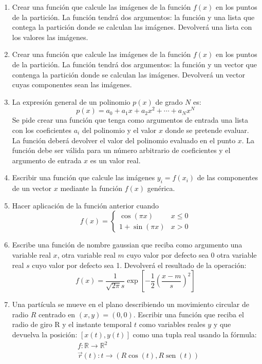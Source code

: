 \documentclass[12pt]{article}
\begin{document}
\begin{enumerate}
\item Crear una función que calcule las imágenes de la función $ f(x) $ 
	en los puntos de la partición. La función tendrá dos argumentos: 
	la función y una lista que contega la partición donde se calculan las imágenes. 
	Devolverá una lista con los valores las imágenes. 
	

\item Crear una función que calcule las imágenes de la función $ f(x) $ 
	en los puntos de la partición. La función tendrá dos argumentos: 
	la función y un vector que contenga la partición donde se calculan las imágenes. 
	Devolverá un vector cuyas componentes sean las imágenes. 
	


\item La expresión general de un polinomio $p(x)$ de grado $N$ es:
	$$
	p(x)=a_{0}+a_{1} x+a_{2} x^{2}+\cdots+a_{N} x^{N}
	$$
Se pide crear una función que tenga como argumentos de entrada una lista con los coeficientes $ a_i $ del polinomio
y el valor $ x $ donde se pretende evaluar. La función deberá devolver 
el valor del polinomio evaluado en el punto $x$.
La función debe ser válida para un número arbitrario de coeficientes 
y el argumento de entrada $x$ es un valor real.	

	
\item Escribir una función que calcule las imágenes  $y_i = f(x_i) $
de las componentes de un vector $ x $ mediante la función $ f(x)$ genérica. 

	

\item Hacer aplicación de la función anterior cuando 
	$$
	f(x) = \left \{
		       \begin{array}{cc}
				    \cos (\pi x) & x \leq 0 \\ 
					1 + \sin(\pi x) & x>0 
				\end{array} 
	       \right.
	$$ 


		
\item Escribe una función de nombre gaussian que reciba como argumento una 
variable real $x$, otra variable real $m$ cuyo valor por defecto sea $0$ 
otra variable real $s$ cuyo valor por defecto sea 1. Devolverá el resultado de la operación:
$$ 	
f(x) = \frac{1}{\sqrt{2 \pi} s}  \exp \left[  -\frac{1}{2}  \left(\frac{x-m}{s} \right)^{2} \right]
$$

		

	
	
\item Una partícula se mueve en el plano describiendo un movimiento 
circular de radio $R$ centrado en $(x, y)=(0,0)$. 
Escribir una función que reciba el radio de giro $\mathrm{R}$ y el instante temporal $t$ 
como variables reales $y$ y que devuelva la posición: $[x(t), y(t)]$ como una tupla real usando la fórmula:
	$$
	\begin{aligned}
		& f: \mathbb{R} \rightarrow \mathbb{R}^{2} \\
		& \vec{r}(t): t \rightarrow(R \cos (t), R \operatorname{sen}(t))
	\end{aligned}
	$$




\end{enumerate}
\end{document}

